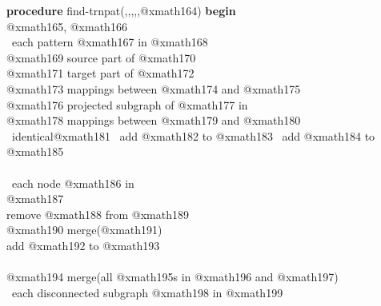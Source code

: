 \begin{figure*}
\raggedright
\small
{\bf procedure} find-trnpat(\Ds,\Dt,\Dc,\Mt,\Mc,@xmath164) {\bf begin}\\
\hspace{5mm} @xmath165, @xmath166 \\
\hspace{5mm} \bffor\ each pattern @xmath167 in @xmath168 \bfbegin {}\\
\hspace{10mm} @xmath169 source part of @xmath170  \\
\hspace{10mm} @xmath171 target part of @xmath172 \\
\hspace{10mm} @xmath173 mappings between @xmath174 and @xmath175 \\
\hspace{10mm} @xmath176 projected subgraph of @xmath177 in \Dc\
\\
\hspace{10mm} @xmath178 mappings between @xmath179 and @xmath180
\aline{al:mbdd}\\
\hspace{10mm} \bfif\ identical@xmath181 \bfthen\ add @xmath182 to @xmath183
\bfelse\ add @xmath184 to @xmath185 \aline{al:mbe}\\ 
\hspace{5mm} \bfend {}\\
\hspace{5mm} \bffor\ each node @xmath186 in \Ds\ \bfbegin {}\\
\hspace{10mm} @xmath187 \aline{al:mcb}\\
\hspace{10mm} remove @xmath188 from @xmath189 \\
\hspace{10mm} @xmath190 merge(@xmath191) \\
\hspace{10mm} add @xmath192 to @xmath193 \\
\hspace{5mm} \bfend {}\\
\hspace{5mm} @xmath194 merge(all @xmath195s in @xmath196 and @xmath197) \\
\hspace{5mm} \bffor\ each disconnected subgraph @xmath198 in @xmath199

\end{figure*}
